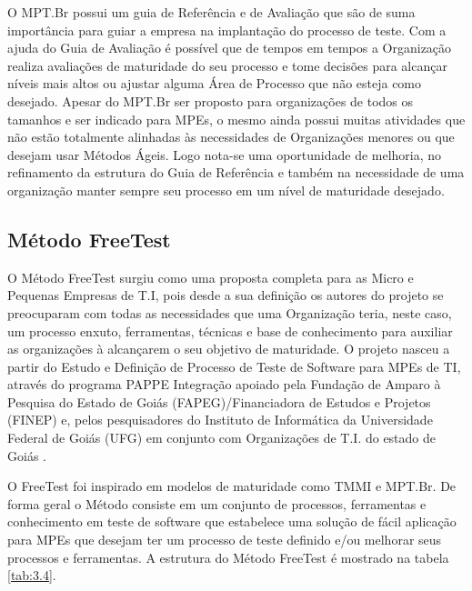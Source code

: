 O MPT.Br possui um guia de Referência e de Avaliação que são de suma importância para guiar a empresa na implantação do processo de teste. Com a ajuda do Guia de Avaliação é possível que de tempos em tempos a Organização realiza avaliações de maturidade do seu processo e tome decisões para alcançar níveis mais altos ou ajustar alguma Área de Processo que não esteja como desejado. Apesar do MPT.Br ser proposto para organizações de todos os tamanhos e ser indicado para MPEs, o mesmo ainda possui muitas atividades que não estão totalmente alinhadas às necessidades de Organizações menores ou que desejam usar Métodos Ágeis. Logo nota-se uma oportunidade de melhoria, no refinamento da estrutura do Guia de Referência e também na necessidade de uma organização manter sempre seu processo em um nível de maturidade desejado.

\subsection{Método FreeTest}
\label{freetest}

O Método FreeTest \cite{Camilo-junior2012} surgiu como uma proposta completa para as Micro e Pequenas Empresas de T.I, pois desde a sua definição os autores do projeto se preocuparam com todas as necessidades que uma Organização teria, neste caso, um processo enxuto, ferramentas, técnicas e base de conhecimento para auxiliar as organizações à alcançarem o seu objetivo de maturidade. O projeto nasceu a partir do Estudo e Definição de Processo de Teste de Software para MPEs de TI, através do programa PAPPE Integração apoiado pela Fundação de Amparo à Pesquisa do Estado de Goiás (FAPEG)/Financiadora de Estudos e Projetos (FINEP) e, pelos pesquisadores do Instituto de Informática da Universidade Federal de Goiás (UFG) em conjunto com Organizações de T.I. do estado de Goiás \cite{Camilo-junior2012}.

O FreeTest foi inspirado em modelos de maturidade como TMMI e MPT.Br. De forma geral o Método consiste em um conjunto de processos, ferramentas e conhecimento em teste de software que estabelece uma solução de fácil aplicação para MPEs que desejam ter um processo de teste definido e/ou melhorar seus processos e ferramentas. A estrutura do Método FreeTest é mostrado na tabela \ref{tab:3.4}.


